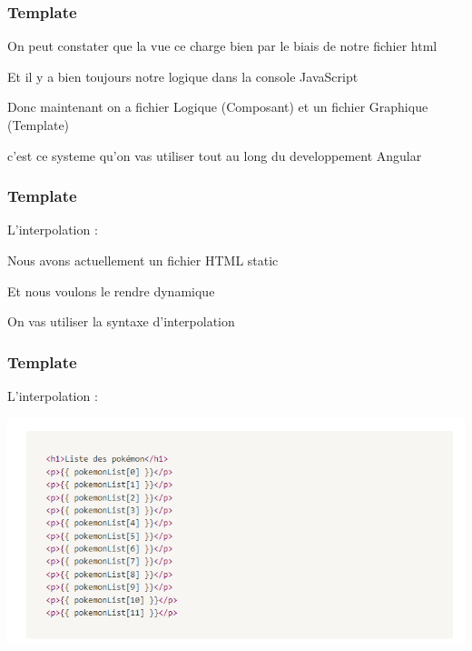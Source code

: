 \documentclass[10pt]{beamer}
\begin{document}
	\begin{frame}
		\frametitle{Template}

		On peut constater que la vue ce charge bien par le biais de notre fichier html \newline \newline

		Et il y a bien toujours notre logique dans la console JavaScript  \newline \newline

		Donc maintenant on a fichier \alert{Logique} (Composant) et un fichier \alert{Graphique} (Template) \newline \newline

		c’est ce systeme qu’on vas utiliser tout au long du developpement Angular

	\end{frame}

	\begin{frame}
		\frametitle{Template}

		L'interpolation : \newline \newline

		Nous avons actuellement un fichier HTML \alert{static} \newline \newline

		Et nous voulons le rendre \alert{dynamique} \newline \newline

		On vas utiliser la syntaxe d’interpolation


	\end{frame}

	\begin{frame}
		\frametitle{Template}

		L'interpolation : \newline


		\centering
		\includegraphics[width=14cm]{assets/inter} \newline


	\end{frame}
\end{document}
